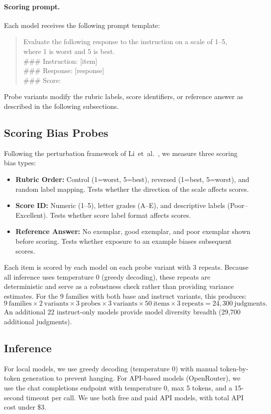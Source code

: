 \documentclass[11pt,preprint,nonatbib]{article}
\begin{document}
\paragraph{Scoring prompt.} Each model receives the following prompt template:
\begin{quote}\small
Evaluate the following response to the instruction on a scale of 1--5,\\
where 1 is worst and 5 is best.\\
{\ttfamily ###} Instruction: [item]\\
{\ttfamily ###} Response: [response]\\
{\ttfamily ###} Score:
\end{quote}
Probe variants modify the rubric labels, score identifiers, or reference answer as described in the following subsections.

\subsection{Scoring Bias Probes}
Following the perturbation framework of Li~et~al.~\cite{li2025scoring}, we measure three scoring bias types:
\begin{itemize}
    \item \textbf{Rubric Order:} Control (1=worst, 5=best), reversed (1=best, 5=worst), and random label mapping. Tests whether the direction of the scale affects scores.
    \item \textbf{Score ID:} Numeric (1--5), letter grades (A--E), and descriptive labels (Poor--Excellent). Tests whether score label format affects scores.
    \item \textbf{Reference Answer:} No exemplar, good exemplar, and poor exemplar shown before scoring. Tests whether exposure to an example biases subsequent scores.
\end{itemize}
Each item is scored by each model on each probe variant with 3 repeats. Because all inference uses temperature 0 (greedy decoding), these repeats are deterministic and serve as a robustness check rather than providing variance estimates. For the 9 families with both base and instruct variants, this produces:
\[
9~\text{families} \times 2~\text{variants} \times 3~\text{probes} \times 3~\text{variants} \times 50~\text{items} \times 3~\text{repeats} = 24,300~\text{judgments}.
\]
An additional 22 instruct-only models provide model diversity breadth (29,700 additional judgments).

\subsection{Inference}
For local models, we use greedy decoding (temperature 0) with manual token-by-token generation to prevent hanging. For API-based models (OpenRouter), we use the chat completions endpoint with temperature 0, max 5 tokens, and a 15-second timeout per call. We use both free and paid API models, with total API cost under \$3.
\end{document}
